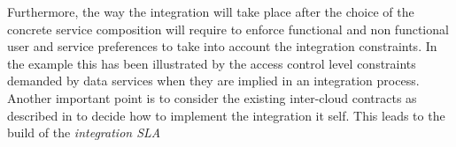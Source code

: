 Furthermore, the way the integration will take place after the choice of the concrete service composition will require to enforce functional and non functional user and service preferences to take into account the integration constraints. In the example this has been illustrated by  the access control level constraints demanded by data services when they are implied in an integration process. Another important point is to consider the existing inter-cloud contracts as described in \cite{} to decide how to implement the integration it self. This leads to the build of the \textit{integration SLA} 
 

%
 


